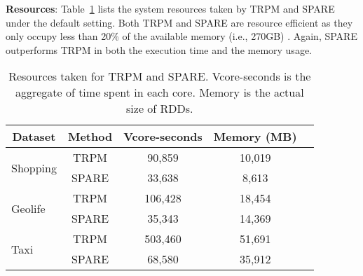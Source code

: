 \textbf{Resources}: Table~\ref{tbl:resource} lists the system resources taken 
by TRPM and SPARE under the default setting. Both TRPM and SPARE are 
resource efficient as they only occupy less than 20\% 
of the available memory (i.e., 270GB) . Again, SPARE outperforms TRPM in both the execution time and the memory usage.


\begin{table}[h]
\centering
\begin{tabular}{|l|c|c|c|c|}
\hline
\multicolumn{1}{|c|}{\textbf{Dataset}} & \textbf{Method} %
& \textbf{Vcore-seconds} & \textbf{Memory (MB)} \\ \hline
\multirow{2}{*}{Shopping}              & TRPM           %
                               & 90,859                 & 10,019               \\ %
                                       & SPARE           %
                                                                      & 33,638                 & 8,613                \\ \hline
\multirow{2}{*}{Geolife}               & TRPM            %
                              & 106,428                & 18,454               \\ %
                                       & SPARE           %
                                                                     & 35,343                 & 14,369               \\ \hline
\multirow{2}{*}{Taxi}                  & TRPM            %
                           & 503,460                & 51,691               \\ %
                                       & SPARE           %
                                                                    & 68,580                & 35,912               \\ \hline
\end{tabular}
\caption{Resources taken for TRPM and SPARE. Vcore-seconds is the aggregate of time spent in each core. Memory is the actual size of RDDs.}
\label{tbl:resource}
\end{table}

